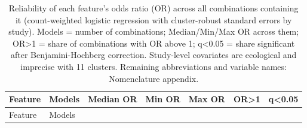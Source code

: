 \documentclass[
  11pt,
]{article}
\begin{document}
\begin{longtable}[]{@{}
  >{\raggedright\arraybackslash}p{}
  >{\raggedright\arraybackslash}p{}
  >{\raggedright\arraybackslash}p{}
  >{\raggedright\arraybackslash}p{}
  >{\raggedright\arraybackslash}p{}
  >{\raggedright\arraybackslash}p{}
  >{\raggedright\arraybackslash}p{}@{}}
\caption{Reliability of each feature's odds ratio (OR) across all
combinations containing it (count-weighted logistic regression with
cluster-robust standard errors by study). Models = number of
combinations; Median/Min/Max OR across them; OR\textgreater1 = share of
combinations with OR above 1; q\textless0.05 = share significant after
Benjamini-Hochberg correction. Study-level covariates are ecological and
imprecise with 11 clusters. Remaining abbreviations and variable names:
Nomenclature appendix.}\tabularnewline
\toprule\noalign{}
\begin{minipage}[b]{\linewidth}\raggedright
Feature
\end{minipage} & \begin{minipage}[b]{\linewidth}\raggedright
Models
\end{minipage} & \begin{minipage}[b]{\linewidth}\raggedright
Median OR
\end{minipage} & \begin{minipage}[b]{\linewidth}\raggedright
Min OR
\end{minipage} & \begin{minipage}[b]{\linewidth}\raggedright
Max OR
\end{minipage} & \begin{minipage}[b]{\linewidth}\raggedright
OR\textgreater1
\end{minipage} & \begin{minipage}[b]{\linewidth}\raggedright
q\textless0.05
\end{minipage} \\
\midrule\noalign{}
\endfirsthead
\toprule\noalign{}
\begin{minipage}[b]{\linewidth}\raggedright
Feature
\end{minipage} & \begin{minipage}[b]{\linewidth}\raggedright
Models
\end{minipage} & \begin{minipage}[b]{\linewidth}\raggedright

\end{minipage}
\end{longtable}
\end{document}
